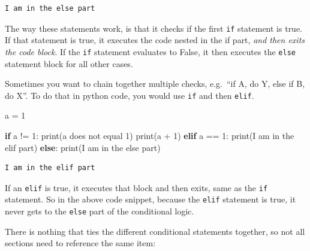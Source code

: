 \documentclass[
  letterpaper,
]{scrbook}
\newenvironment{Shaded}{\begin{snugshade}}{\end{snugshade}}
\newcommand{\BuiltInTok}[1]{\textcolor[rgb]{0.00,0.23,0.31}{#1}}
\newcommand{\ControlFlowTok}[1]{\textcolor[rgb]{0.00,0.23,0.31}{\textbf{#1}}}
\newcommand{\DecValTok}[1]{\textcolor[rgb]{0.68,0.00,0.00}{#1}}
\newcommand{\NormalTok}[1]{\textcolor[rgb]{0.00,0.23,0.31}{#1}}
\newcommand{\OperatorTok}[1]{\textcolor[rgb]{0.37,0.37,0.37}{#1}}
\newcommand{\StringTok}[1]{\textcolor[rgb]{0.13,0.47,0.30}{#1}}
\begin{document}
\begin{verbatim}
I am in the else part
\end{verbatim}

The way these statements work, is that it checks if the first
\texttt{if} statement is true. If that statement is true, it executes
the code nested in the if part, \emph{and then exits the code block}. If
the \texttt{if} statement evaluates to False, it then executes the
\texttt{else} statement block for all other cases.

Sometimes you want to chain together multiple checks, e.g.~``if A, do Y,
else if B, do X''. To do that in python code, you would use \texttt{if}
and then \texttt{elif}.

\begin{Shaded}
\begin{Highlighting}[]
\NormalTok{a }\OperatorTok{=} \DecValTok{1}

\ControlFlowTok{if}\NormalTok{ a }\OperatorTok{!=} \DecValTok{1}\NormalTok{:}
  \BuiltInTok{print}\NormalTok{(}\StringTok{\textquotesingle{}a does not equal 1\textquotesingle{}}\NormalTok{)}
  \BuiltInTok{print}\NormalTok{(a }\OperatorTok{+} \DecValTok{1}\NormalTok{)}
\ControlFlowTok{elif}\NormalTok{ a }\OperatorTok{==} \DecValTok{1}\NormalTok{:}
  \BuiltInTok{print}\NormalTok{(}\StringTok{\textquotesingle{}I am in the elif part\textquotesingle{}}\NormalTok{)}
\ControlFlowTok{else}\NormalTok{:}
  \BuiltInTok{print}\NormalTok{(}\StringTok{\textquotesingle{}I am in the else part\textquotesingle{}}\NormalTok{)}
\end{Highlighting}
\end{Shaded}

\begin{verbatim}
I am in the elif part
\end{verbatim}

If an \texttt{elif} is true, it executes that block and then exits, same
as the \texttt{if} statement. So in the above code snippet, because the
\texttt{elif} statement is true, it never gets to the \texttt{else} part
of the conditional logic.

There is nothing that ties the different conditional statements
together, so not all sections need to reference the same item:
\end{document}
